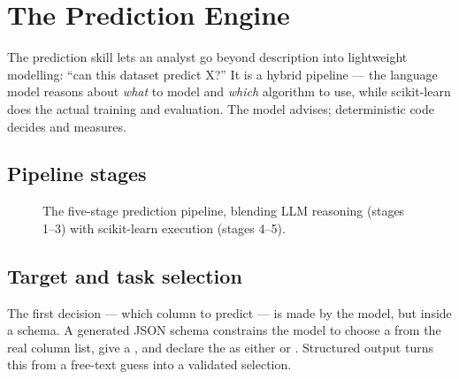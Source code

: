 \chapter{The Prediction Engine}
\label{ch:predict}

The prediction skill lets an analyst go beyond description into lightweight
modelling: ``can this dataset predict X?'' It is a hybrid pipeline --- the
language model reasons about \emph{what} to model and \emph{which} algorithm to
use, while scikit-learn does the actual training and evaluation. The model
advises; deterministic code decides and measures.

\section{Pipeline stages}
\begin{figure}[h]
\centering
{}
\caption{The five-stage prediction pipeline, blending LLM reasoning (stages 1--3)
with scikit-learn execution (stages 4--5).}
\label{fig:predict}
\end{figure}

\section{Target and task selection}
The first decision --- which column to predict --- is made by the model, but
inside a schema. A generated JSON schema constrains the model to choose a
 from the real column list, give a , and
declare the  as either  or
. Structured output turns this from a free-text guess into a
validated selection.

